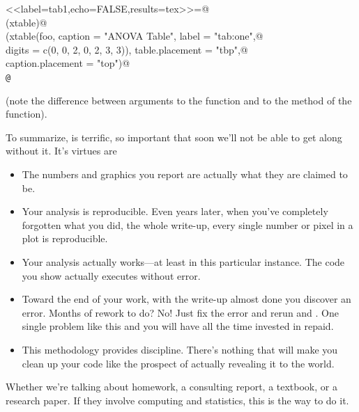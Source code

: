 \documentclass{article}
\begin{document}
\begin{tabbing}
\verb@<<label=tab1,echo=FALSE,results=tex>>=@ \\
\verb@library(xtable)@ \\
\verb@print(xtable(foo, caption = "ANOVA Table", label = "tab:one",@ \\
\verb@    digits = c(0, 0, 2, 0, 2, 3, 3)), table.placement = "tbp",@ \\
\verb@    caption.placement = "top")@ \\
\verb+@+
\end{tabbing}
(note the difference between arguments to the \verb@xtable@ function
and to the \verb@xtable@ method of the \verb@print@ function).

To summarize, \verb@Sweave@ is terrific, so important that soon
we'll not be able to get along without it.  It's virtues are
\begin{itemize}
\item The numbers and graphics you report are actually what they
are claimed to be.
\item Your analysis is reproducible.  Even years later, when you've
completely forgotten what you did, the whole write-up, every single
number or pixel in a plot is reproducible.
\item Your analysis actually works---at least in this particular instance.
The code you show actually executes without error.
\item Toward the end of your work, with the write-up almost done you
discover an error.  Months of rework to do?  No!  Just fix the error
and rerun \verb@Sweave@ and \verb@latex@.  One single problem like
this and you will have all the time invested in \verb@Sweave@ repaid.
\item This methodology provides discipline.
There's nothing that will make you clean up your code like
the prospect of actually revealing it to the world.
\end{itemize}

Whether we're talking about homework, a consulting report, a textbook,
or a research paper.  If they involve computing and statistics,
this is the way to do it.
\end{document}
